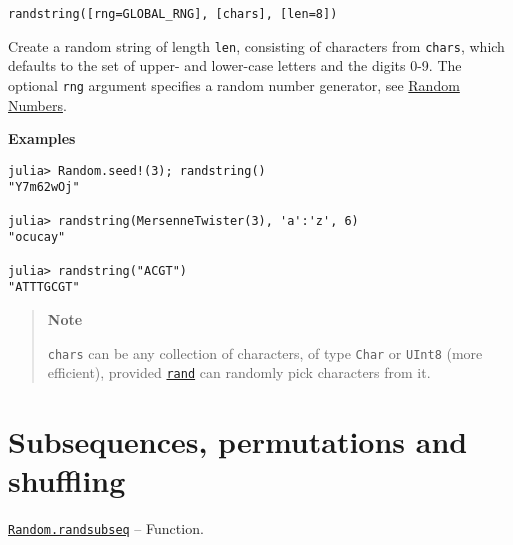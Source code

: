 \begin{adjustwidth}{2em}{0pt}


\begin{verbatim}
randstring([rng=GLOBAL_RNG], [chars], [len=8])
\end{verbatim}

Create a random string of length \texttt{len}, consisting of characters from \texttt{chars}, which defaults to the set of upper- and lower-case letters and the digits 0-9. The optional \texttt{rng} argument specifies a random number generator, see \href{@ref}{Random Numbers}.

\textbf{Examples}


\begin{verbatim}
julia> Random.seed!(3); randstring()
"Y7m62wOj"

julia> randstring(MersenneTwister(3), 'a':'z', 6)
"ocucay"

julia> randstring("ACGT")
"ATTTGCGT"
\end{verbatim}

\begin{quote}
\textbf{Note}

\texttt{chars} can be any collection of characters, of type \texttt{Char} or \texttt{UInt8} (more efficient), provided \hyperlink{7668863842145012694}{\texttt{rand}} can randomly pick characters from it.

\end{quote}


\end{adjustwidth}

\hypertarget{1694954649783113139}{}


\section{Subsequences, permutations and shuffling}


\hypertarget{10454370655022505544}{}
\hyperlink{10454370655022505544}{\texttt{Random.randsubseq}}  -- {Function.}

